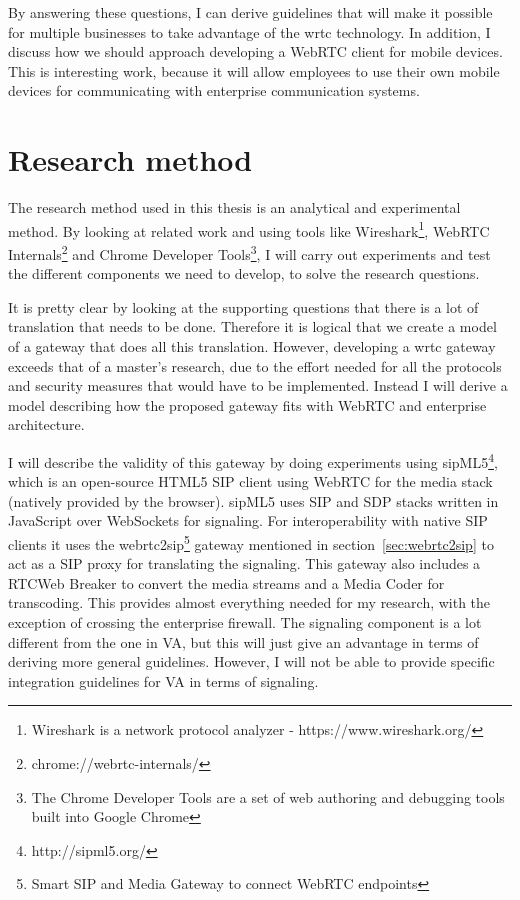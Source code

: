 By answering these questions, I can derive guidelines that will make it possible for multiple businesses to take advantage of the \gls{wrtc} technology. In addition, I discuss how we should approach developing a WebRTC client for mobile devices. This is interesting work, because it will allow employees to use their own mobile devices for communicating with enterprise communication systems.


\section{Research method}
The research method used in this thesis is an analytical and experimental method. By looking at related work and using tools like Wireshark\footnote{Wireshark is a network protocol analyzer - https://www.wireshark.org/}, WebRTC Internals\footnote{chrome://webrtc-internals/} and Chrome Developer Tools\footnote{The Chrome Developer Tools are a set of web authoring and debugging tools built into Google Chrome}, I will carry out experiments and test the different components we need to develop, to solve the research questions.

It is pretty clear by looking at the supporting questions that there is a lot of translation that needs to be done. Therefore it is logical that we create a model of a gateway that does all this translation. However, developing a \gls{wrtc} gateway exceeds that of a master's research, due to the effort needed for all the protocols and security measures that would have to be implemented. Instead I will derive a model describing how the proposed gateway fits with WebRTC and enterprise architecture.

I will describe the validity of this gateway by doing experiments using sipML5\footnote{http://sipml5.org/}, which is an open-source HTML5 SIP client using WebRTC for the media stack (natively provided by the browser). sipML5 uses SIP and SDP stacks written in JavaScript over WebSockets for signaling. For interoperability with native SIP clients it uses the webrtc2sip\footnote{Smart SIP and Media Gateway to connect WebRTC endpoints} gateway mentioned in section~\ref{sec:webrtc2sip} to act as a SIP proxy for translating the signaling. This gateway also includes a RTCWeb Breaker to convert the media streams and a Media Coder for transcoding. This provides almost everything needed for my research, with the exception of crossing the enterprise firewall. The signaling component is a lot different from the one in VA, but this will just give an advantage in terms of deriving more general guidelines. However, I will not be able to provide specific integration guidelines for VA in terms of signaling. 

